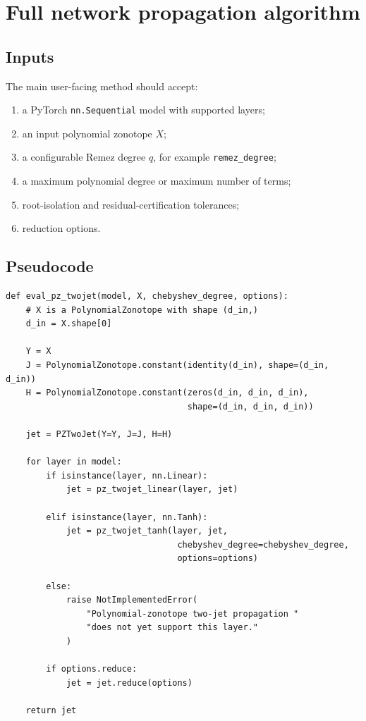 \documentclass[11pt]{article}
\begin{document}
\section{Full network propagation algorithm}

\subsection{Inputs}

The main user-facing method should accept:
\begin{enumerate}[label=(\roman*)]
    \item a PyTorch \texttt{nn.Sequential} model with supported layers;
    \item an input polynomial zonotope \(X\);
    \item a configurable Remez degree \(q\), for example \texttt{remez\_degree};
    \item a maximum polynomial degree or maximum number of terms;
    \item root-isolation and residual-certification tolerances;
    \item reduction options.
\end{enumerate}

\subsection{Pseudocode}

\begin{verbatim}
def eval_pz_twojet(model, X, chebyshev_degree, options):
    # X is a PolynomialZonotope with shape (d_in,)
    d_in = X.shape[0]

    Y = X
    J = PolynomialZonotope.constant(identity(d_in), shape=(d_in, d_in))
    H = PolynomialZonotope.constant(zeros(d_in, d_in, d_in),
                                    shape=(d_in, d_in, d_in))

    jet = PZTwoJet(Y=Y, J=J, H=H)

    for layer in model:
        if isinstance(layer, nn.Linear):
            jet = pz_twojet_linear(layer, jet)

        elif isinstance(layer, nn.Tanh):
            jet = pz_twojet_tanh(layer, jet,
                                  chebyshev_degree=chebyshev_degree,
                                  options=options)

        else:
            raise NotImplementedError(
                "Polynomial-zonotope two-jet propagation "
                "does not yet support this layer."
            )

        if options.reduce:
            jet = jet.reduce(options)

    return jet
\end{verbatim}
\end{document}
